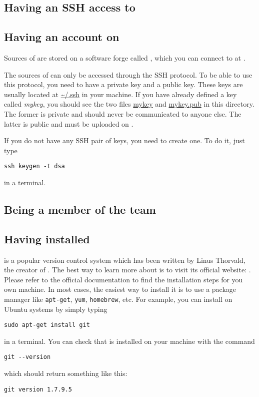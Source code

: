 \subsection{Having an SSH access to \SourceSup}


\subsection{Having an account on \SourceSup}

Sources of \Simol are stored on a software forge called \SourceSup, which you can connect to at \urlSourceSup.  

The sources of \Simol can only be accessed through the SSH protocol. To be able to use this protocol, you need to have a private key and a public key. These keys are usually located at \url{~/.ssh} in your machine. If you have already defined a key called \textit{mykey}, you should see the two files \url{mykey} and \url{mykey.pub} in this directory. The former is private and should never be communicated to anyone else. The latter is public and must be uploaded on \SourceSup. 

If you do not have any SSH pair of keys, you need to create one. To do it, just type
\begin{verbatim}
ssh keygen -t dsa
\end{verbatim}
in a terminal.

\subsection{Being a member of the \Simol team}






\subsection{Having \Git installed}


\Git is a popular version control system which has been written by Linus Thorvald, the creator of \Linux. The best way to learn more about \Git is to visit its official website: \urlGit. Please refer to the official documentation to find the installation steps for you own machine. In most cases, the easiest way to install it is to use a package manager like \texttt{apt-get}, \texttt{yum}, \texttt{homebrew}, etc. For example, you can install \Git on Ubuntu systems by simply typing
\begin{verbatim}
sudo apt-get install git
\end{verbatim}
in a terminal. You can check that \Git is installed on your machine with the command
\begin{verbatim}
git --version
\end{verbatim}
which should return something like this:
\begin{verbatim}
git version 1.7.9.5
\end{verbatim}


